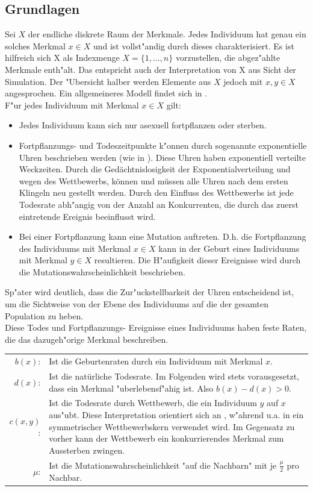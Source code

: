 \documentclass[11pt, a4paper, german]{article}
\theoremstyle{plain}
\begin{document}
	\subsection{Grundlagen}
	Sei $ X $ der endliche diskrete Raum der Merkmale. Jedes Individuum hat genau ein solches Merkmal $ x \in X $ und ist vollst"andig durch dieses charakterisiert. Es ist hilfreich sich X als Indexmenge $ X = \{1,\dots, n\} $ vorzustellen, die abgez"ahlte Merkmale enth"alt. Das entspricht auch der Interpretation von X aus Sicht der Simulation. Der "Ubersicht halber werden Elemente aus $ X $ jedoch mit $ x,y \in X $ angesprochen. Ein allgemeineres Modell findet sich in \cite{raey}.\\
	F"ur jedes Individuum mit Merkmal $ x \in X $ gilt:
	\begin{itemize}
		\item Jedes Individuum kann sich nur asexuell fortpflanzen oder sterben.
		\item Fortpflanzungs- und Todeszeitpunkte k"onnen durch sogenannte exponentielle Uhren beschrieben werden (wie in \cite[S. 3]{fournier2004microscopic}). Diese Uhren haben exponentiell verteilte Weckzeiten. Durch die Gedächtnislosigkeit der Exponentialverteilung und wegen des Wettbewerbs, können und müssen alle Uhren nach dem ersten Klingeln neu gestellt werden. Durch den Einfluss des Wettbewerbs ist jede Todesrate abh"angig von der Anzahl an Konkurrenten, die durch das zuerst eintretende Ereignis beeinflusst wird. 
		\item Bei einer Fortpflanzung kann eine Mutation auftreten. D.h. die Fortpflanzung des Individuums mit Merkmal $ x \in X $ kann in der Geburt eines Individuums mit Merkmal $ y \in X $ resultieren. Die H"aufigkeit dieser Ereignisse wird durch die Mutationswahrscheinlichkeit beschrieben.
	\end{itemize}
	Sp"ater wird deutlich, dass die Zur"uckstellbarkeit der Uhren entscheidend ist, um die Sichtweise von der Ebene des Individuums auf die der gesamten Population zu heben.\\
	Diese Todes und Fortpflanzungs- Ereignisse eines Individuums haben feste Raten, die das dazugeh"orige Merkmal beschreiben.\\
	
	\begin{tabular}{r p{26em}}
		$ b(x) $: & Ist die Geburtenraten durch ein Individuum mit Merkmal $ x $.\\
		$ d(x) $: & Ist die natürliche Todesrate. Im Folgenden wird stets vorausgesetzt, dass ein Merkmal "uberlebensf"ahig ist. Also $ b(x) - d(x) > 0 $.\\
		$ c(x, y) $: & Ist die Todesrate durch Wettbewerb, die ein Individuum $ y $ auf $ x $ aus"ubt. Diese Interpretation orientiert sich an \cite{raey}, w"ahrend u.a. in \cite{Champagnat20061127} ein symmetrischer Wettbewerbskern verwendet wird. Im Gegensatz zu vorher kann der Wettbewerb ein konkurrierendes Merkmal zum Aussterben zwingen.\\
		$ \mu $: & Ist die Mutationswahrscheinlichkeit "{}auf die Nachbarn"{} mit je $ \frac{\mu}{2} $ pro Nachbar. \\
	\end{tabular}\\
\end{document}
